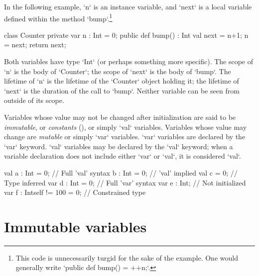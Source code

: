 In the following example, \xcd`n` is an instance variable, and \xcd`next` is a
local variable defined within the method \xcd`bump`.\footnote{This code is
unnecessarily turgid for the sake of the example.  One would generally write
\xcd`public def bump() = ++n;`.   }
\begin{xten}
class Counter {
  private var n : Int = 0;
  public def bump() : Int {
    val next = n+1;
    n = next;
    return next;
    }
}
\end{xten}
%
Both variables have type \xcd`Int` (or
perhaps something more specific).    The scope of \xcd`n` is the body of
\xcd`Counter`; the scope of \xcd`next` is the body of \xcd`bump`.  The
lifetime of \xcd`n` is the lifetime of the \xcd`Counter` object holding it;
the lifetime of \xcd`next` is the duration of the call to \xcd`bump`. Neither
variable can be seen from outside of its scope.

\label{exploded-syntax}
\label{VariableDeclarations}


Variables whose value may not be changed after initialization are said to be
{\em immutable}, or {\em constants} (), or simply
\xcd`val` variables. Variables whose value may change are {\em mutable} or
simply \xcd`var` variables. \xcd`var` variables are declared by the \xcd`var`
keyword. \xcd`val` variables may be declared by the \xcd`val` keyword; when a
variable declaration does not include either \xcd`var` or \xcd`val`, it is
considered \xcd`val`. 


\begin{xten}
val a : Int = 0;               // Full 'val' syntax
b : Int = 0;                   // 'val' implied
val c = 0;                     // Type inferred
var d : Int = 0;               // Full 'var' syntax
var e : Int;                   // Not initialized
var f : Int{self != 100} = 0;  // Constrained type
\end{xten}







\section{Immutable variables}
\label{FinalVariables}

